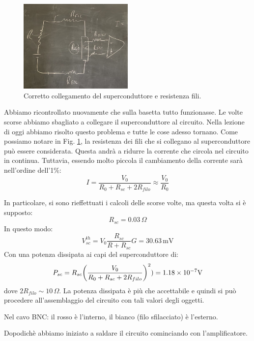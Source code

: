 \documentclass[../main/main.tex]{subfiles}
\begin{document}
\begin{figure}[h!]
\centering
\includegraphics[width=0.5\textwidth]{../lessons/image/08/4.jpg}
\caption{\label{fig:08_3} Corretto collegamento del superconduttore e resistenza fili.}
\end{figure}

Abbiamo ricontrollato nuovamente che sulla basetta tutto funzionasse. Le volte scorse abbiamo sbagliato a collegare il superconduttore al circuito. Nella lezione di oggi abbiamo risolto questo problema e tutte le cose adesso tornano. Come possiamo notare in Fig. \ref{fig:08_3}, la resistenza dei fili che si collegano al superconduttore può essere considerata. Questa andrà a ridurre la corrente che circola nel circuito in continua. Tuttavia, essendo molto piccola il cambiamento della corrente sarà nell'ordine dell'1$\%$:
\begin{equation*}
  I = \frac{V_0}{R_0 + R_{sc} + 2 R_{filo} } \approx \frac{V_0}{R_0}
\end{equation*}

In particolare, si sono rieffettuati i calcoli delle scorse volte, ma questa volta si è supposto:
\begin{equation*}
  R_{sc} = 0.03 \, \Omega
\end{equation*}
In questo modo:
\begin{equation*}
  V_{sc}^{th} = V_0 \frac{R_{sc}}{R+R_{sc} } G = 30.63\, \text{mV}
\end{equation*}
Con una potenza dissipata ai capi del superconduttore di:
\begin{equation*}
  P_{sc} = R_{sc} \qty(\frac{V_0}{R_0 + R_{sc} + 2 R_{filo} })^2 ) = 1.18 \times 10^{-7} \text{V}
\end{equation*}
dove \( 2 R_{filo} \sim 10 \, \Omega  \). La potenza dissipata è più che accettabile e quindi si può procedere all'assemblaggio del circuito con tali valori degli oggetti.


\begin{remark}
Nel cavo BNC: il rosso è l'interno, il bianco (filo sfilacciato) è l'esterno.
\end{remark}

Dopodichè abbiamo iniziato a saldare il circuito cominciando con l'amplificatore.
\end{document}
